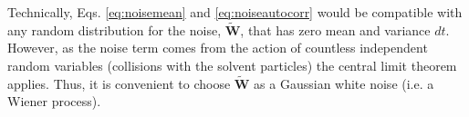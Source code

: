 \documentclass[twoside,openright,titlepage,numbers=noenddot,%
headinclude,footinclude,cleardoublepage=empty,abstract=on,
BCOR=5mm,fontsize=11pt, dvipsnames, paper=b5
]{scrreprt}
\renewcommand{\vec}[1]{\bm{#1}}
\newcommand{\noise}{\widetilde{W}}
\newcommand{\pvel}{u}
\begin{document}
Technically, Eqs. \eqref{eq:noisemean} and \eqref{eq:noiseautocorr} would be compatible with any random distribution for the noise, $\vec{\noise}$, that has zero mean and variance $dt$. However, as the noise term comes from the action of countless independent random variables (collisions with the solvent particles) the central limit theorem\cite{Feller1968} applies. Thus, it is convenient to choose $\vec{\noise}$ as a Gaussian white noise (i.e. a Wiener process)\cite{dunweg1991}.

%
\end{document}
